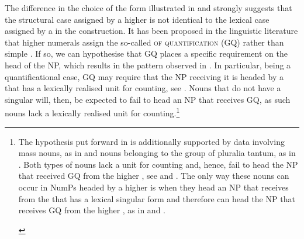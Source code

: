 \documentclass[output=paper,modfonts,newtxmath,hidelinks]{langscibook}
\begin{document}
\noindent The difference in the choice of the  form illustrated in  and  strongly suggests that the structural case assigned by a higher  is not identical to the lexical case assigned by a  in the  construction. It has been proposed in the linguistic literature that  higher numerals assign the so-called \textsc{ of quantification} (GQ) rather than simple  \citep{Bošković2006}. If so, we can hypothesise that GQ places a specific requirement on the head of the NP, which results in the pattern observed in . In particular, being a quantificational case, GQ may require that the NP receiving it is headed by a  that has a lexically realised unit for counting, see . Nouns that do not have a singular  will, then, be expected to fail to head an NP that receives GQ, as such nouns lack a lexically realised unit for counting.\footnote{\label{18:fn4}The hypothesis put forward in  is additionally supported by data involving mass nouns, as in  and nouns belonging to the group of pluralia tantum, as in . Both types of nouns lack a unit for counting and, hence, fail to head the NP that received GQ from the higher , see  and . The only way these nouns can occur in NumPs headed by a higher  is when they head an NP that receives  from the  that has a lexical singular form and therefore can head the NP that receives GQ from the higher , as in  and .

\begin{multicols}{2}
\ea \label{18:fn4i}
	\label{18:fn4ia}
    \label{18:fn4ib}
    \z
\z

\columnbreak

\ea \label{18:fn4ii}
	\label{18:fn4iia}
    \label{18:fn4iib}
    \z
\z


\end{multicols}}
\end{document}
